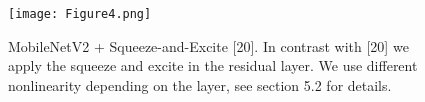 \begin{figure}[!htbp]
    \centering
    \texttt{[image: Figure4.png]}
    \caption{MobileNetV2 + Squeeze-and-Excite [20]. In contrast with [20] we apply the squeeze and excite in the residual layer.
    We use different nonlinearity depending on the layer, see section 5.2 for details.}
    \label{fig:src_fig4}
\end{figure}

% 